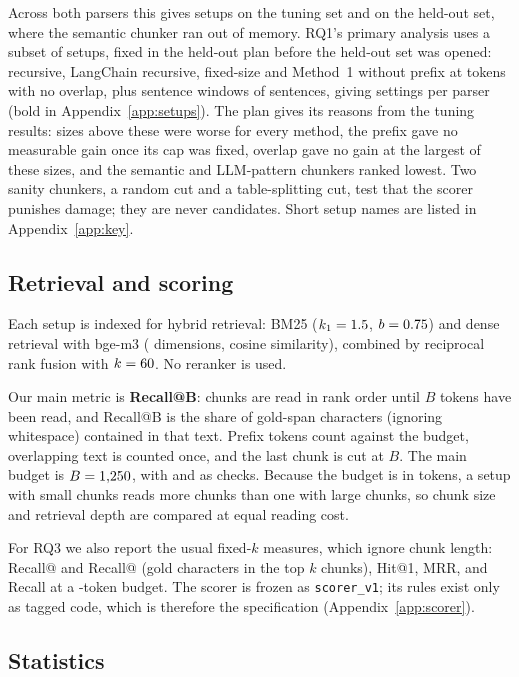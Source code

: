 Across both parsers this gives \TuningSetups{} setups on the tuning set
and \HeldOutSetups{} on the held-out set, where the semantic chunker ran
out of memory. RQ1's primary analysis uses a subset of \RQoneSetups{}
setups, fixed in the held-out plan before the held-out set was opened:
recursive, LangChain recursive, fixed-size and Method~1 without prefix at
\RQonePrimarySizes{} tokens with no overlap, plus sentence windows of
\RQonePrimarySentenceWindow{} sentences, giving \RQonePrimarySettings{}
settings per parser (bold in Appendix~\ref{app:setups}). The plan gives
its reasons from the tuning results: sizes above these were worse for
every method, the prefix gave no measurable gain once its cap was fixed,
overlap gave no gain at the largest of these sizes, and the semantic and LLM-pattern chunkers ranked
lowest. Two sanity chunkers,
a random cut and a table-splitting cut, test that the scorer punishes
damage; they are never candidates. Short setup names are listed in
Appendix~\ref{app:key}.

\subsection{Retrieval and scoring}
\label{sec:scoring}

Each setup is indexed for hybrid retrieval: BM25 ($k_1=1.5{}$,
$b=0.75{}$) and dense retrieval with bge-m3 (\EmbedDim{} dimensions,
cosine similarity), combined by reciprocal rank fusion with
$k=60{}$. No reranker is used.

Our main metric is \textbf{Recall@B}: chunks are read in rank order
until $B$ tokens have been read, and Recall@B is the share of gold-span
characters (ignoring whitespace) contained in that text. Prefix tokens
count against the budget, overlapping text is counted once, and the last
chunk is cut at $B$. The main budget is $B=1{,}250{}$, with
\BudgetLow{} and \BudgetHigh{} as checks. Because the budget is in
tokens, a setup with small chunks reads more chunks than one with large
chunks, so chunk size and retrieval depth are compared at equal reading
cost.

For RQ3 we also report the usual fixed-$k$ measures, which ignore chunk
length: Recall@\TopKSmall{} and Recall@\TopKLarge{} (gold characters in
the top $k$ chunks), Hit@1, MRR, and Recall at a \FixedKBudget{}-token
budget. The scorer is frozen as \texttt{scorer\_v1}; its rules exist
only as tagged code, which is therefore the specification
(Appendix~\ref{app:scorer}).

\subsection{Statistics}
\label{sec:stats}


